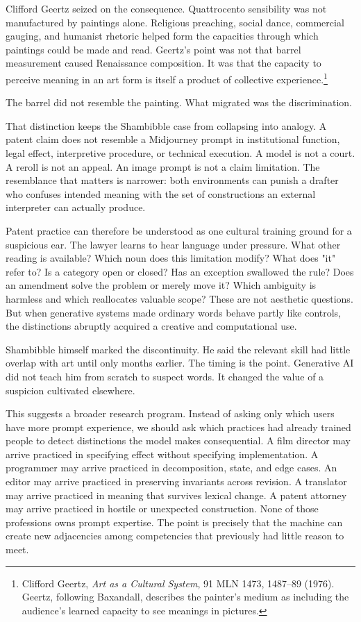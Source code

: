 \documentclass[11pt]{article}
\begin{document}
Clifford Geertz seized on the consequence. Quattrocento sensibility was not manufactured by paintings alone. Religious preaching, social dance, commercial gauging, and humanist rhetoric helped form the capacities through which paintings could be made and read. Geertz's point was not that barrel measurement caused Renaissance composition. It was that the capacity to perceive meaning in an art form is itself a product of collective experience.\footnote{Clifford Geertz, \textit{Art as a Cultural System}, 91 MLN 1473, 1487--89 (1976). Geertz, following Baxandall, describes the painter's medium as including the audience's learned capacity to see meanings in pictures.}

The barrel did not resemble the painting. What migrated was the discrimination.

That distinction keeps the Shambibble case from collapsing into analogy. A patent claim does not resemble a Midjourney prompt in institutional function, legal effect, interpretive procedure, or technical execution. A model is not a court. A reroll is not an appeal. An image prompt is not a claim limitation. The resemblance that matters is narrower: both environments can punish a drafter who confuses intended meaning with the set of constructions an external interpreter can actually produce.

Patent practice can therefore be understood as one cultural training ground for a suspicious ear. The lawyer learns to hear language under pressure. What other reading is available? Which noun does this limitation modify? What does "it" refer to? Is a category open or closed? Has an exception swallowed the rule? Does an amendment solve the problem or merely move it? Which ambiguity is harmless and which reallocates valuable scope? These are not aesthetic questions. But when generative systems made ordinary words behave partly like controls, the distinctions abruptly acquired a creative and computational use.

Shambibble himself marked the discontinuity. He said the relevant skill had little overlap with art until only months earlier. The timing is the point. Generative AI did not teach him from scratch to suspect words. It changed the value of a suspicion cultivated elsewhere.

This suggests a broader research program. Instead of asking only which users have more prompt experience, we should ask which practices had already trained people to detect distinctions the model makes consequential. A film director may arrive practiced in specifying effect without specifying implementation. A programmer may arrive practiced in decomposition, state, and edge cases. An editor may arrive practiced in preserving invariants across revision. A translator may arrive practiced in meaning that survives lexical change. A patent attorney may arrive practiced in hostile or unexpected construction. None of those professions owns prompt expertise. The point is precisely that the machine can create new adjacencies among competencies that previously had little reason to meet.
\end{document}

